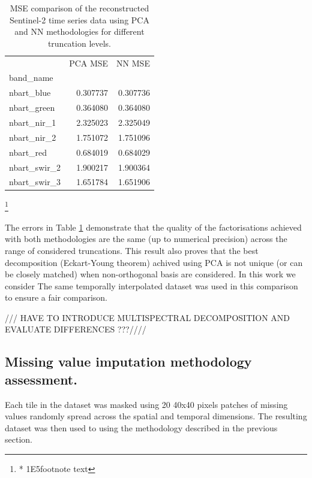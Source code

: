\documentclass[essd, manuscript]{copernicus}
\begin{document}
\begin{table}[h!]
\centering
\begin{tabular}{|l|r|r|}
	\toprule
	\hline
	{} &   PCA MSE &    NN MSE \\
	band\_name    &           &           \\
	\midrule
	\hline\hline
	nbart\_blue   &  0.307737 &  0.307736 \\
	\hline
	nbart\_green  &  0.364080 &  0.364080 \\
	\hline
	nbart\_nir\_1  &  2.325023 &  2.325049 \\
	\hline
	nbart\_nir\_2  &  1.751072 &  1.751096 \\
	\hline
	nbart\_red    &  0.684019 &  0.684029 \\
	\hline
	nbart\_swir\_2 &  1.900217 &  1.900364 \\
	\hline
	nbart\_swir\_3 &  1.651784 &  1.651906 \\
	\hline
	\bottomrule
\end{tabular}
\footnote{* 1E5footnote text}
\caption{MSE comparison of the reconstructed Sentinel-2 time series data using PCA and NN methodologies for different truncation levels.}%
\label{components_error}
\end{table}

The errors in Table \ref{components_error} demonstrate that the quality of the factorisations achieved with both methodologies are the same (up to numerical precision) across the range of considered truncations. This result also proves that the best decomposition (Eckart-Young theorem) achived using PCA is not unique (or can be closely matched) when non-orthogonal basis are considered.
In this work we consider  The same temporally interpolated dataset was used in this comparison to ensure a fair comparison. 


/// HAVE TO INTRODUCE MULTISPECTRAL DECOMPOSITION AND EVALUATE DIFFERENCES ???////

\subsection{Missing value imputation methodology assessment.}
Each tile in the dataset was masked using 20 40x40 pixels patches of missing values randomly spread across the spatial and temporal dimensions. The resulting dataset was then used to  using the methodology described in the previous section. 
\end{document}
